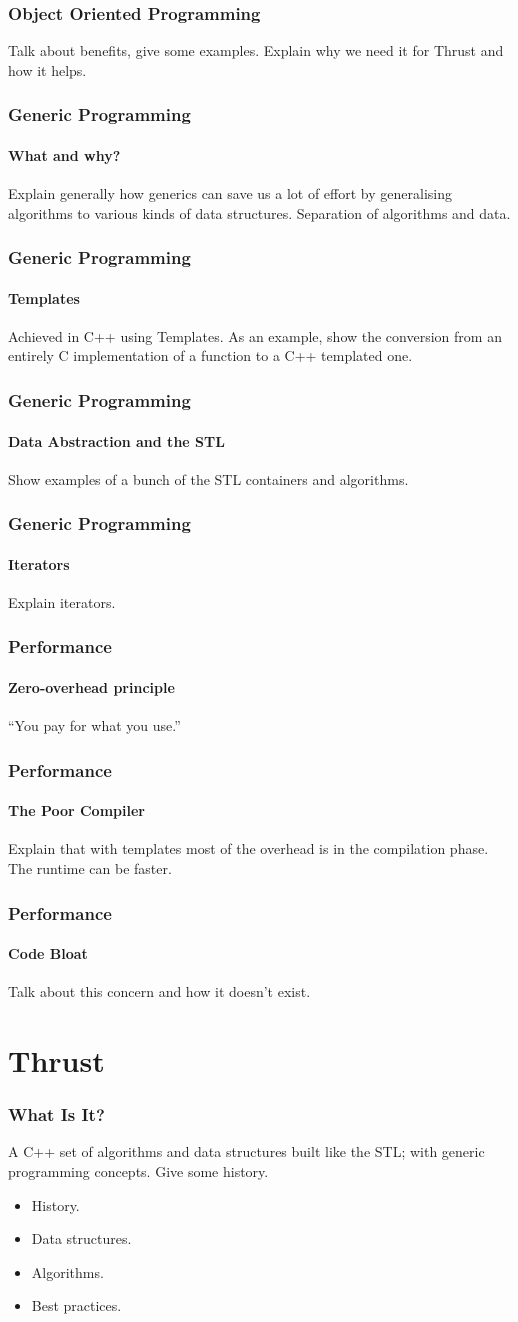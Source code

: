 \documentclass{beamer}
\begin{document}
\begin{frame}
  \frametitle{Object Oriented Programming}
  Talk about benefits, give some examples. Explain why
  we need it for Thrust and how it helps.
\end{frame}

\begin{frame}
  \frametitle{Generic Programming}
  \framesubtitle{What and why?}
  Explain generally how generics can save us a lot
  of effort by generalising algorithms to various kinds
  of data structures. Separation of algorithms and data.
\end{frame}

\begin{frame}
  \frametitle{Generic Programming}
  \framesubtitle{Templates}
  Achieved in C++ using Templates.
  As an example, show the conversion from an entirely C
  implementation of a function to a C++ templated one.
\end{frame}

\begin{frame}
  \frametitle{Generic Programming}
  \framesubtitle{Data Abstraction and the STL}
  Show examples of a bunch of the STL containers and 
  algorithms.
\end{frame}

\begin{frame}
  \frametitle{Generic Programming}
  \framesubtitle{Iterators}
  Explain iterators.
\end{frame}

\begin{frame}
  \frametitle{Performance}
  \framesubtitle{Zero-overhead principle}
  {\Huge ``You pay for what you use.''}
\end{frame}

\begin{frame}
  \frametitle{Performance}
  \framesubtitle{The Poor Compiler}
  Explain that with templates most of the overhead is
  in the compilation phase. The runtime can be faster.
\end{frame}

\begin{frame}
  \frametitle{Performance}
  \framesubtitle{Code Bloat}
  Talk about this concern and how it doesn't exist.
\end{frame}

\section{Thrust}

\begin{frame}
  \frametitle{What Is It?}
  A C++ set of algorithms and data structures built like
  the STL; with generic programming concepts.
  Give some history.
  \begin{itemize}
    \item History.
    \item Data structures.
    \item Algorithms.
    \item Best practices.
  \end{itemize}
\end{frame}
\end{document}
